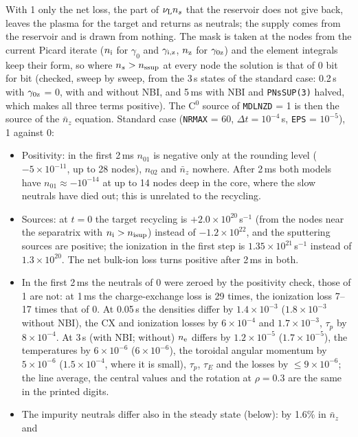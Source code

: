 \documentclass[11pt]{article}
\def\r#1{{\rm#1}}
\def\nee{n_\r{e}}
\def\ni{n_\r{i}}
\def\nz{n_\r{z}}
\def\nsup#1{n_\r{#1sup}}
\def\nnz{\bar{n}_{z}}
\def\nuL{\nu_\r{L}}
\begin{document}
With 1 only the net loss, the part of $\nuL n_s$ that the reservoir does not give
back, leaves the plasma for the target and returns as neutrals; the supply comes
from the reservoir and is drawn from nothing.  The mask is taken at the nodes from the
current Picard iterate ($\ni$ for $\gamma_0$ and $\gamma_\r{i,z}$, $\nz$ for
$\gamma_\r{0z}$) and the element integrals keep their form, so where $n_s>\nsup{s}$
at every node the solution is that of 0 bit for bit (checked, sweep by sweep, from the
3\,s states of the standard case: 0.2\,s with $\gamma_\r{0z}$ = 0, with and without NBI,
and 5\,ms with NBI and \texttt{PNsSUP(3)} halved, which makes all three terms positive).  The C$^0$
source of \texttt{MDLNZD} = 1 is then the source of the $\nnz$ equation.  Standard
case (\texttt{NRMAX} = 60, $\Delta t = 10^{-4}$\,s, \texttt{EPS} = $10^{-5}$), 1
against 0:
\begin{itemize}
\item Positivity: in the first 2\,ms $n_{01}$ is negative only at the rounding level
  ($-5\times10^{-11}$, up to 28 nodes), $n_{02}$ and $\nnz$ nowhere.  After 2\,ms both
  models have $n_{01}\approx-10^{-14}$ at up to 14 nodes deep in the core, where the
  slow neutrals have died out; this is unrelated to the recycling.
\item Sources: at $t=0$ the target recycling is $+2.0\times10^{20}$\,s$^{-1}$ (from
  the nodes near the separatrix with $\ni>\nsup{i}$) instead of $-1.2\times10^{22}$, and
  the sputtering sources are positive; the ionization in the first step is
  $1.35\times10^{21}$\,s$^{-1}$ instead of $1.3\times10^{20}$.  The net bulk-ion loss turns
  positive after 2\,ms in both.
\item In the first 2\,ms the neutrals of 0 were zeroed by the positivity check, those of 1 are
  not: at 1\,ms the charge-exchange loss is 29 times, the ionization loss 7--17 times that of
  0.  At 0.05\,s the densities differ by $1.4\times10^{-3}$ ($1.8\times10^{-3}$ without NBI),
  the CX and ionization losses by $6\times10^{-4}$ and $1.7\times10^{-3}$, $\tau_p$ by
  $8\times10^{-4}$.  At 3\,s (with NBI; without) $\nee$ differs by $1.2\times10^{-5}$
  ($1.7\times10^{-5}$), the temperatures by $6\times10^{-6}$ ($6\times10^{-6}$), the
  toroidal angular momentum by $5\times10^{-6}$ ($1.5\times10^{-4}$, where it is small),
  $\tau_p$, $\tau_E$ and the losses by $\le9\times10^{-6}$; the line average, the central
  values and the rotation at $\rho = 0.3$ are the same in the printed digits.
\item The impurity neutrals differ also in the steady state (below): by 1.6\% in $\nnz$ and

\end{itemize}
\end{document}
